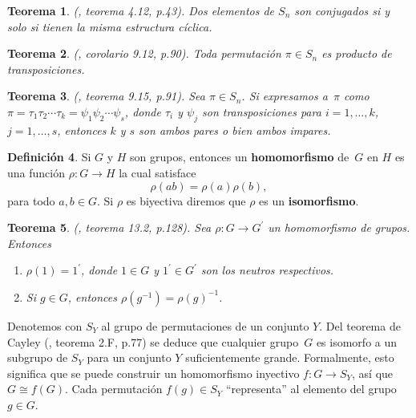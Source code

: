 \documentclass[12pt]{book}
\newtheorem{theorem}{Teorema}[section]
\theoremstyle{definition}
\newtheorem{definition}[theorem]{Definición}
\newcounter{in}
\newcounter{ini}
\begin{document}
\begin{theorem}{\normalfont (\cite{zaldivar}, teorema 4.12, p.43)}.
  Dos elementos de $S_{n}$ son conjugados si y solo si tienen la misma
  estructura cíclica.   
\end{theorem}

\begin{theorem}{\normalfont (\cite{fraleigh}, corolario 9.12, p.90)}.
  \label{per-prod-trans}
  Toda permutación $\pi\in S_{n}$ es producto de transposiciones.
\end{theorem}

\begin{theorem}{\normalfont (\cite{fraleigh}, teorema 9.15, p.91)}.
  \label{trans-par-impar}
  Sea $\pi\in S_{n}$. Si expresamos a~$\pi$ como $\pi=\tau_{1}\tau_{2}\cdots\tau_{k}=\psi_{1}\psi_{2}\cdots\psi_{s}$,
  donde $\tau_{i}$ y $\psi_{j}$ son transposiciones para
  $i=1,\ldots,k$, $j=1,\ldots,s$, entonces $k$ y $s$
  son ambos pares o bien ambos impares.
\end{theorem}

\begin{definition}
  Si $G$ y $H$ son grupos, entonces un \textbf{homomorfismo} de~$G$
  en $H$ es una función $\rho:G\rightarrow H$ la cual
  satisface $$\rho(ab)=\rho(a)\rho(b),$$
  para todo $a,b \in G$. Si $\rho$ es biyectiva diremos que $\rho$ es
  un \textbf{isomorfismo}.
\end{definition}

\begin{theorem}{\normalfont (\cite{fraleigh}, teorema 13.2, p.128)}.
  Sea $\rho:G\rightarrow G^{'}$ un homomorfismo de grupos. Entonces
  \begin{enumerate}
    \item $\rho(1)=1^{'}$, donde $1\in G$ y  $1^{'}\in G^{'}$ son los
    neutros respectivos. 
    \item Si $g\in G$, entonces $\rho(g^{-1})=\rho (g)^{-1}$.
  \end{enumerate}
\end{theorem}

Denotemos con $S_{Y}$ al grupo de permutaciones de un conjunto $Y$. Del
teorema de Cayley (\cite{herstein1990algebra}, teorema 2.F, p.77)
se deduce que cualquier grupo~$G$ es isomorfo a un subgrupo de $S_{Y}$
para un conjunto $Y$ suficientemente grande. Formalmente, esto
significa que se puede construir un homomorfismo inyectivo
$f:G\rightarrow S_{Y}$, así que $G\cong f(G)$. Cada permutación
$f(g)\in S_{Y}$ ``representa'' al elemento del grupo $g\in G$.
\end{document}
